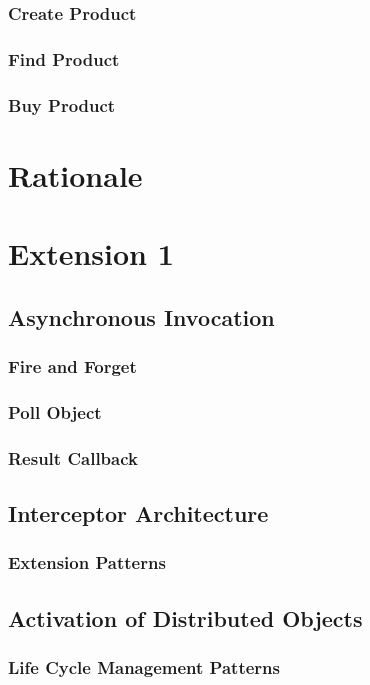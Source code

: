 \documentclass[a4paper]{article}
\begin{document}
\subsubsection{Create Product}

\subsubsection{Find Product}

\subsubsection{Buy Product}

\section{Rationale}

\section{Extension 1}

\subsection{Asynchronous Invocation}
\subsubsection{Fire and Forget}
\subsubsection{Poll Object}
\subsubsection{Result Callback}

\subsection{Interceptor Architecture}
\subsubsection{Extension Patterns}

\subsection{Activation of Distributed Objects}
\subsubsection{Life Cycle Management Patterns}
\end{document}
